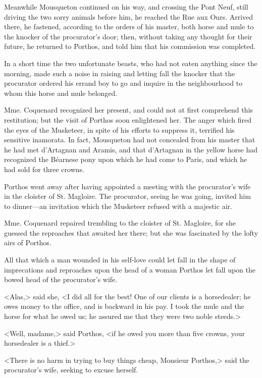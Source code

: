 Meanwhile Mousqueton continued on his way, and crossing the Pont Neuf, still driving the two sorry animals before him, he reached the Rue aux Ours. Arrived there, he fastened, according to the orders of his master, both horse and mule to the knocker of the procurator's door; then, without taking any thought for their future, he returned to Porthos, and told him that his commission was completed. 

In a short time the two unfortunate beasts, who had not eaten anything since the morning, made such a noise in raising and letting fall the knocker that the procurator ordered his errand boy to go and inquire in the neighbourhood to whom this horse and mule belonged. 

Mme. Coquenard recognized her present, and could not at first comprehend this restitution; but the visit of Porthos soon enlightened her. The anger which fired the eyes of the Musketeer, in spite of his efforts to suppress it, terrified his sensitive inamorata. In fact, Mousqueton had not concealed from his master that he had met d'Artagnan and Aramis, and that d'Artagnan in the yellow horse had recognized the Béarnese pony upon which he had come to Paris, and which he had sold for three crowns. 

Porthos went away after having appointed a meeting with the procurator's wife in the cloister of St. Magloire. The procurator, seeing he was going, invited him to dinner---an invitation which the Musketeer refused with a majestic air. 

Mme. Coquenard repaired trembling to the cloister of St. Magloire, for she guessed the reproaches that awaited her there; but she was fascinated by the lofty airs of Porthos. 

All that which a man wounded in his self-love could let fall in the shape of imprecations and reproaches upon the head of a woman Porthos let fall upon the bowed head of the procurator's wife. 

<Alas,> said she, <I did all for the best! One of our clients is a horsedealer; he owes money to the office, and is backward in his pay. I took the mule and the horse for what he owed us; he assured me that they were two noble steeds.> 

<Well, madame,> said Porthos, <if he owed you more than five crowns, your horsedealer is a thief.> 

<There is no harm in trying to buy things cheap, Monsieur Porthos,> said the procurator's wife, seeking to excuse herself. 

